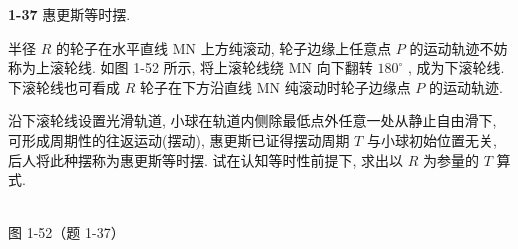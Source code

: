 \newpage

\textbf{1-37} 惠更斯等时摆.

半径 $R$ 的轮子在水平直线 MN 上方纯滚动, 轮子边缘上任意点 $P$ 的运动轨迹不妨称为上滚轮线. 如图 1-52 所示, 将上滚轮线绕 MN 向下翻转 $180^{\circ}$ , 成为下滚轮线. 下滚轮线也可看成 $R$ 轮子在下方沿直线 MN 纯滚动时轮子边缘点 $P$ 的运动轨迹.

沿下滚轮线设置光滑轨道, 小球在轨道内侧除最低点外任意一处从静止自由滑下, 可形成周期性的往返运动(摆动), 惠更斯已证得摆动周期 $T$ 与小球初始位置无关, 后人将此种摆称为惠更斯等时摆. 试在认知等时性前提下, 求出以 $R$ 为参量的 $T$ 算式.

\begin{center}
\resizebox{0.55\textwidth}{!}{}\\[4pt]
{\small 图 1-52（题 1-37）}
\end{center}

